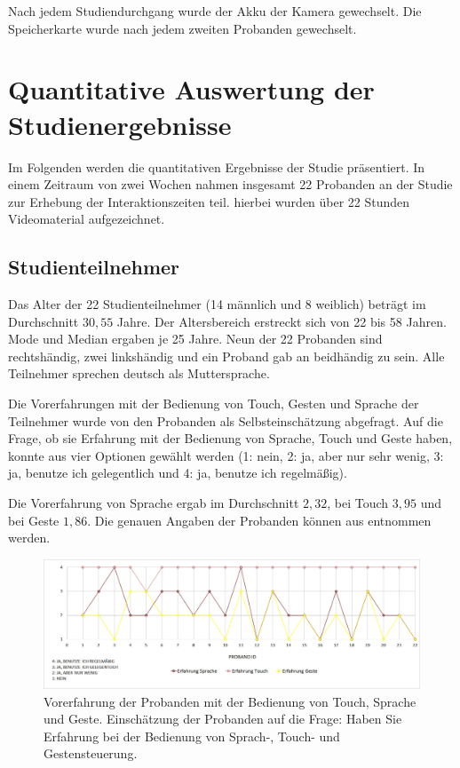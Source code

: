 Nach jedem Studiendurchgang wurde der Akku der Kamera gewechselt. Die Speicherkarte wurde nach jedem zweiten Probanden gewechselt.

\section[Quantitative Auswertung]{Quantitative Auswertung der Studienergebnisse}
Im Folgenden werden die quantitativen Ergebnisse der Studie präsentiert.
In einem Zeitraum von zwei Wochen nahmen insgesamt 22 Probanden an der Studie zur Erhebung der Interaktionszeiten teil.
hierbei wurden über 22 Stunden Videomaterial aufgezeichnet. 
\subsection[Studienteilnehmer]{Studienteilnehmer}
Das Alter der 22 Studienteilnehmer (14 männlich und 8 weiblich) beträgt im Durchschnitt $30,55$ Jahre. 
Der Altersbereich erstreckt sich von 22 bis 58 Jahren. 
Mode und Median ergaben je 25 Jahre. Neun der 22 Probanden sind rechtshändig, zwei linkshändig und ein Proband gab an beidhändig zu sein. 
Alle Teilnehmer sprechen deutsch als Muttersprache.

Die Vorerfahrungen mit der Bedienung von Touch, Gesten und Sprache der Teilnehmer wurde von den Probanden als Selbsteinschätzung abgefragt. 
Auf die Frage, ob sie Erfahrung mit der Bedienung von Sprache, Touch und Geste haben, konnte aus vier Optionen gewählt werden (1: nein, 2: ja, aber nur sehr wenig, 3: ja, benutze ich gelegentlich und 4: ja, benutze ich regelmäßig). 

Die Vorerfahrung von Sprache ergab im Durchschnitt $2,32$, bei Touch $3,95$ und bei Geste $1,86$. Die genauen Angaben der Probanden können aus  entnommen werden.
\begin{figure}[ht]
  \centering
  \includegraphics[width=1\textwidth]{img/ErfahrungProbanden2.jpg}
  \caption[Vorerfahrung der Probanden]{Vorerfahrung der Probanden mit der Bedienung von Touch, Sprache und Geste. Einschätzung der Probanden auf die Frage: Haben Sie Erfahrung bei der Bedienung von Sprach-, Touch- und Gestensteuerung.}
  \label{fig:Vorerfahrung}
\end{figure}


